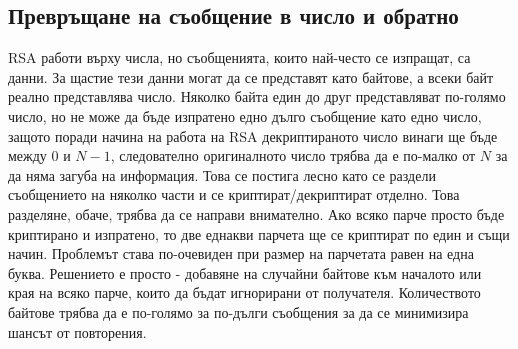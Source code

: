   \subsection{Превръщане на съобщение в число и обратно} \label{paddingscheme}
  RSA работи върху числа, но съобщенията, които най-често се изпращат, са данни. За щастие тези данни могат да се представят като байтове, а всеки байт реално представлява число. Няколко байта един до друг представляват по-голямо число, но не може да бъде изпратено едно дълго съобщение като едно число, защото поради начина на работа на RSA декриптираното число винаги ще бъде между $0$ и $N-1$, следователно оригиналното число трябва да е по-малко от $N$ за да няма загуба на информация. Това се постига лесно като се раздели съобщението на няколко части и се криптират/декриптират отделно. Това разделяне, обаче, трябва да се направи внимателно. Ако всяко парче просто бъде криптирано и изпратено, то две еднакви парчета ще се криптират по един и същи начин. Проблемът става по-очевиден при размер на парчетата равен на една буква. Решението е просто - добавяне на случайни байтове към началото или края на всяко парче, които да бъдат игнорирани от получателя. Количеството байтове трябва да е по-голямо за по-дълги съобщения за да се минимизира шансът от повторения.

